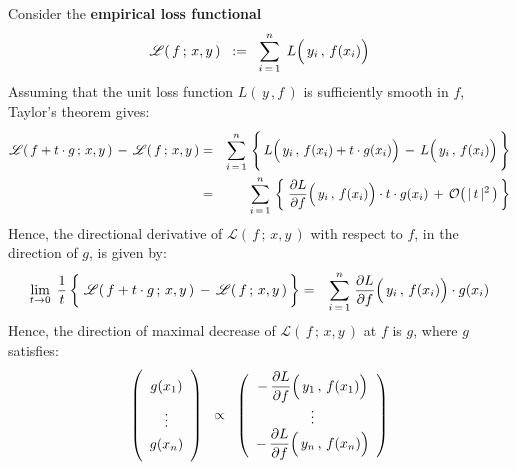 \noindent
Consider the \textbf{empirical loss functional}
\begin{equation*}
\mathscr{L}(\,f\,;\,x,y\,)
\;\; := \;\;
	\overset{n}{\underset{i\,=\,1}{\sum}}\;\,
	L\!\left(\,y_{i}\,,\,\overset{{\color{white}.}}{f(x_{i})}\right)
\end{equation*}
Assuming that the unit loss function $L(\,y\,,f\,)$ is sufficiently smooth in $f$,
Taylor's theorem gives:
\begin{eqnarray*}
\mathscr{L}(\,f + t \cdot g\,;\,x,y\,)
\,-\,
\mathscr{L}(\,f \,;\,x,y\,)
& = &
	\overset{n}{\underset{i\,=\,1}{\sum}}\,
	\left\{\,
		\overset{{\color{white}1}}{L\!\left(\,y_{i}\,,\,\overset{{\color{white}.}}{f(x_{i}) + t \cdot g(x_{i})}\right)}
		\, - \,
		L\!\left(\,y_{i}\,,\,\overset{{\color{white}.}}{f(x_{i})}\right)
		\,\right\}
\\
& = &
	\overset{n}{\underset{i\,=\,1}{\sum}}\,
	\left\{\;
		\dfrac{\partial L}{\partial f}\!\left(\,y_{i}\,,\,\overset{{\color{white}.}}{f(x_{i})}\right) \cdot t \cdot g(x_{i})
		\, + \,
		\mathcal{O}\!\left(\,\vert\,t\,\vert^{2}\,\right)
		\,\right\}
\end{eqnarray*}
Hence, the directional derivative of $\mathscr{L}(\,f\,;\,x,y\,)$
with respect to $f$, in the direction of $g$, is given by:
\begin{eqnarray*}
\underset{t \rightarrow 0}{\lim}\;\,
\dfrac{1}{t}
\left\{\;
	\overset{{\color{white}1}}{\mathscr{L}(\,f + t \cdot g\,;\,x,y\,)}
	\,-\,
	\mathscr{L}(\,f \,;\,x,y\,)
	\,\right\}
& = &
	\overset{n}{\underset{i\,=\,1}{\sum}}\;
	\dfrac{\partial L}{\partial f}\!\left(\,y_{i}\,,\,\overset{{\color{white}.}}{f(x_{i})}\right) \cdot g(x_{i})
\end{eqnarray*}
Hence, the direction of maximal decrease of $\mathscr{L}(\,f\,;\,x,y\,)$ at $f$ is $g$, where $g$ satisfies:
\begin{equation*}
\left(%
\begin{array}{c}
	\overset{{\color{white}1}}{g(x_{1})}
	\\
	\underset{{\color{white}1}}{\overset{{\color{white}1}}{\vdots}}
	\\
	\underset{{\color{white}1}}{g(x_{n})}
	\end{array}\right)
\;\; \propto \;\;
	\left(\begin{array}{c}
		-\, \dfrac{\partial L}{\partial f}\!\left(\,y_{1}\,,\,\overset{{\color{white}.}}{f(x_{1})}\right)
		\\
		\vdots
		\\
		-\, \dfrac{\partial L}{\partial f}\!\left(\,y_{n}\,,\,\overset{{\color{white}.}}{f(x_{n})}\right)
		\end{array}\right)
\end{equation*}

